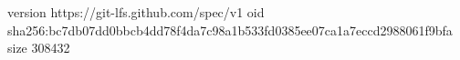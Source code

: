 version https://git-lfs.github.com/spec/v1
oid sha256:bc7db07dd0bbcb4dd78f4da7c98a1b533fd0385ee07ca1a7eccd2988061f9bfa
size 308432
